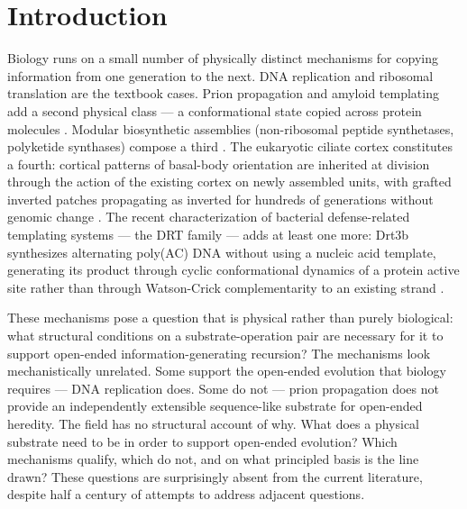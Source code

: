 \documentclass[aps,prx,reprint,amsmath,amssymb,floatfix,superscriptaddress,nofootinbib]{revtex4-2}
\theoremstyle{plain-thm}
\theoremstyle{definition-thm}
\begin{document}
\section{Introduction}

Biology runs on a small number of physically distinct mechanisms for copying information from one generation to the next. DNA replication and ribosomal translation are the textbook cases. Prion propagation and amyloid templating add a second physical class --- a conformational state copied across protein molecules \citep{Greenwald2016}. Modular biosynthetic assemblies (non-ribosomal peptide synthetases, polyketide synthases) compose a third \citep{Walsh2001}. The eukaryotic ciliate cortex constitutes a fourth: cortical patterns of basal-body orientation are inherited at division through the action of the existing cortex on newly assembled units, with grafted inverted patches propagating as inverted for hundreds of generations without genomic change \citep{BeissonSonneborn1965, Frankel1989}. The recent characterization of bacterial defense-related templating systems --- the DRT family \citep{Deng2026, DRT1preprint2026, DRT7preprint2026} --- adds at least one more: Drt3b synthesizes alternating poly(AC) DNA without using a nucleic acid template, generating its product through cyclic conformational dynamics of a protein active site rather than through Watson-Crick complementarity to an existing strand \citep{Deng2026}.

These mechanisms pose a question that is physical rather than purely biological: what structural conditions on a substrate-operation pair are necessary for it to support open-ended information-generating recursion? The mechanisms look mechanistically unrelated. Some support the open-ended evolution that biology requires --- DNA replication does. Some do not --- prion propagation does not provide an independently extensible sequence-like substrate for open-ended heredity. The field has no structural account of why. What does a physical substrate need to be in order to support open-ended evolution? Which mechanisms qualify, which do not, and on what principled basis is the line drawn? These questions are surprisingly absent from the current literature, despite half a century of attempts to address adjacent questions.
\end{document}
